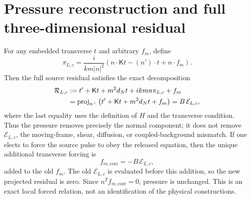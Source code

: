 \section{Pressure reconstruction and full three-dimensional residual}
For any embedded transverse $t$ and arbitrary $f_m$, define
\begin{equation}
 \pi_{L,c}=\frac{i}{km|n|^2}
 \left(n\cdot\mathsf Kt-(n')\cdot t+n\cdot f_m\right).
 \label{eq:pressuremap}
\end{equation}
Then the full source residual satisfies the exact decomposition
\begin{align}
 \mathcal R_{L,c}
 &: =t'+\mathsf Kt+m^2d_Nt+ikm n\pi_{L,c}+f_m \\
 &=\operatorname{proj}_{n^\perp}\left(t'+\mathsf Kt+m^2d_Nt+f_m\right)
 =B\,\mathcal E_{L,c},
 \label{eq:fullresidual}
\end{align}
where the last equality uses the definition of $H$ and the transverse condition.
Thus the pressure removes precisely the normal component; it does not remove
$\mathcal E_{L,c}$, the moving-frame, shear, diffusion, or coupled-background
mismatch.  If one elects to force the source pulse to obey the released equation,
then the unique additional transverse forcing is
\begin{equation}
 f_{m,\mathrm{corr}}=-B\,\mathcal E_{L,c},
\end{equation}
added to the old $f_m$. The old $\mathcal E_{L,c}$ is evaluated before
this addition, so the new projected residual is zero.
Since $n^Tf_{m,\mathrm{corr}}=0$, pressure is unchanged.
This is an exact local
forced relation, not an identification of the physical constructions.

